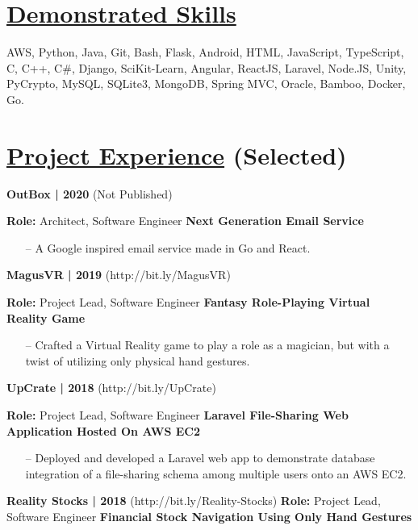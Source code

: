 \documentclass{article}
\begin{document}
\begin{multicols}{2}
\section*{\underline{Demonstrated Skills}}
{\footnotesize{
AWS, Python, Java, Git, Bash, Flask, Android, HTML, JavaScript, TypeScript, C, C++, C\#, Django, SciKit-Learn, Angular, ReactJS, Laravel, Node.JS, Unity, PyCrypto, MySQL, SQLite3, MongoDB, Spring MVC, Oracle, Bamboo, Docker, Go.
}}
\hfill
\hfill \break
\section*{\underline{Project Experience} {\small(Selected)}}
{\footnotesize{\textbf{OutBox | 2020} (Not Published)}}
{\footnotesize{
\newline\textbf{Role:} Architect, Software Engineer
\newline\textbf{Next Generation Email Service}
\begin{itemize}
	\item[--] A Google inspired email service made in Go and React.
\end{itemize}
\hfill \break
}}
{\footnotesize{\textbf{MagusVR | 2019} (http://bit.ly/MagusVR)}}
{\footnotesize{
\newline\textbf{Role:} Project Lead, Software Engineer
\newline\textbf{Fantasy Role-Playing Virtual Reality Game}
\begin{itemize}
	\item[--] Crafted a Virtual Reality game to play a role as a magician, but with a twist of utilizing only physical hand gestures.
\end{itemize}
\hfill \break
}}
{\footnotesize{\textbf{UpCrate | 2018} (http://bit.ly/UpCrate)}}
{\footnotesize{
\newline\textbf{Role:} Project Lead, Software Engineer
\newline\textbf{Laravel File-Sharing Web Application Hosted On AWS EC2}
\begin{itemize}
	\item[--] Deployed and developed a Laravel web app to demonstrate database integration of a file-sharing schema among multiple users onto an AWS EC2.
\end{itemize}
\hfill \break
}}
{\footnotesize{\textbf{Reality Stocks | 2018} (http://bit.ly/Reality-Stocks)}}
{\footnotesize{
\newline\textbf{Role:} Project Lead, Software Engineer
\newline\textbf{Financial Stock Navigation Using Only Hand Gestures}
}}
\end{multicols}
\end{document}
